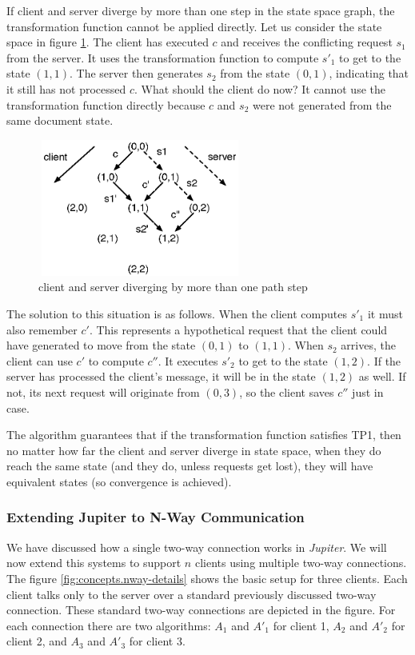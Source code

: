 If client and server diverge by more than one step in the state space graph, the transformation function cannot be applied directly. Let us consider the state space in figure \ref{fig:concepts.statespace2}. The client has executed $c$ and receives the conflicting request $s_1$ from the server. It uses the transformation function to compute $s'_1$ to get to the state $(1,1)$. The server then generates $s_2$ from the state $(0,1)$, indicating that it still has not processed $c$. What should the client do now? It cannot use the transformation function directly because $c$ and $s_2$ were not generated from the same document state.

\begin{figure}[htb]
 \centering
 \includegraphics[width=6.71cm,height=4.5cm]{../images/finalreport/concepts_statespace2.eps}
 \caption{client and server diverging by more than one path step}
 \label{fig:concepts.statespace2}
\end{figure}

The solution to this situation is as follows. When the client computes $s'_1$ it 
must also remember $c'$. This represents a hypothetical request that the client 
could have generated to move from the state $(0,1)$ to $(1,1)$. When $s_2$
arrives, the client can use $c'$ to compute $c''$. It executes $s'_2$ to get to 
the state $(1,2)$. If the server has processed the client's message, it will be 
in the state $(1,2)$ as well. If not, its next request will originate from 
$(0,3)$, so the client saves $c''$ just in case.

The algorithm guarantees that if the transformation function satisfies TP1, then no matter how far the client and server diverge in state space, when they do reach the same state (and they do, unless requests get lost), they will have equivalent states (so convergence is achieved).

\subsubsection{Extending Jupiter to N-Way Communication}
We have discussed how a single two-way connection works in \emph{Jupiter}. We will now extend this systems to support $n$ clients using multiple two-way connections. The figure \ref{fig:concepts.nway-details} shows the basic setup for three clients. Each client talks only to the server over a standard previously discussed two-way connection. These standard two-way connections
are depicted in the figure. For each connection there are two algorithms:
$A_1$ and $A'_1$ for client 1, $A_2$ and $A'_2$ for client 2, and $A_3$ and
$A'_3$ for client 3.  

